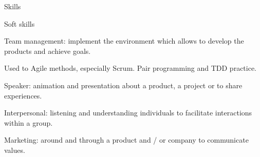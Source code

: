 \begin{rSection}{Skills}
  \begin{rSubsection}{Soft skills}{}{}{}
    \item Team management: implement the environment which allows to develop the products and achieve goals.
    \item Used to Agile methods, especially Scrum. Pair programming and TDD practice.
    \item Speaker: animation and presentation about a product, a project or to share experiences.
    \item Interpersonal: listening and understanding individuals to facilitate interactions within a group.
    \item Marketing: around and through a product and / or company to communicate values.
  \end{rSubsection}

\end{rSection}
